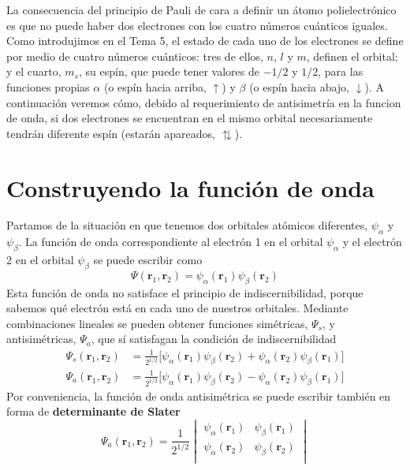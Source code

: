 \documentclass{tufte-handout}
\begin{document}
La consecuencia del principio de Pauli de cara a definir 
un átomo polielectrónico es que no puede haber dos electrones con
los cuatro números cuánticos iguales. Como introdujimos en el 
Tema 5, el estado de cada uno de los electrones se define por medio
de cuatro números cuánticos: tres de ellos, $n$, $l$ y $m$, 
definen el orbital; y el cuarto, $m_s$, su espín, que puede
tener valores de $-1/2$ y $1/2$, para las funciones propias $\alpha$
(o espín hacia arriba, $\uparrow$) y $\beta$ (o espín hacia abajo, $\downarrow$).
A continuación veremos
cómo, debido al requerimiento de antisimetría en la funcion de onda, 
si dos electrones se encuentran en el mismo orbital necesariamente 
tendrán diferente espín (estarán apareados, $\updownarrows$).
%

\section{Construyendo la función de onda}
Partamos de la situación en que tenemos dos orbitales
atómicos diferentes, $\psi_\alpha$ y $\psi_\beta$. 
La función de onda correspondiente al electrón 1 en el 
orbital $\psi_\alpha$ y el electrón 2 en el orbital 
$\psi_\beta$ se puede escribir como
\begin{equation}
    \Psi(\mathbf{r}_1, \mathbf{r}_2) = \psi_\alpha (\mathbf{r}_1)\psi_\beta (\mathbf{r}_2)
\end{equation}
Esta función de onda no satisface el principio
de indiscernibilidad, porque sabemos qué electrón está en
cada uno de nuestros orbitales. Mediante combinaciones
lineales se pueden obtener funciones simétricas, $\Psi_s$,
y antisimétricas, $\Psi_a$, que sí satisfagan la condición
de indiscernibilidad
\begin{align}
    \Psi_s(\mathbf{r}_1, \mathbf{r}_2) &= \frac{1}{2^{1/2}} \big[\psi_\alpha(\mathbf{r}_1) \psi_\beta(\mathbf{r}_2) +  \psi_\alpha(\mathbf{r}_2) \psi_\beta(\mathbf{r}_1)\big]\\
    \Psi_a(\mathbf{r}_1, \mathbf{r}_2) &=\frac{1}{2^{1/2}}  \big[\psi_\alpha(\mathbf{r}_1) \psi_\beta(\mathbf{r}_2) -  \psi_\alpha(\mathbf{r}_2) \psi_\beta(\mathbf{r}_1)\big]
\end{align}
Por conveniencia, la función de onda antisimétrica se puede 
escribir también en forma de \textbf{determinante 
de Slater}
\begin{equation}
    \Psi_a(\mathbf{r}_1,\mathbf{r}_2) = \frac{1}{2^{1/2}}
    \begin{vmatrix} 
    \psi_\alpha(\mathbf{r}_1) & \psi_\beta(\mathbf{r}_1)   \\
    \psi_\alpha(\mathbf{r}_2) & \psi_\beta(\mathbf{r}_2)  \\
    \end{vmatrix}
\end{equation}
\end{document}
